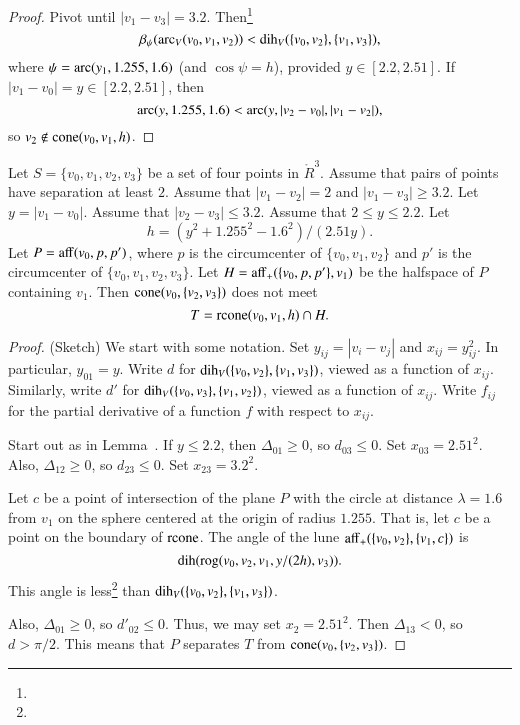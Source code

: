 \begin{proof}
Pivot until
$|v_1-v_3|=3.2$. Then\footnote{} %
    $$\beta_\psi(\operatorname{arc}_V(v_0,v_1,v_2))< \operatorname{dih}_V(\{v_0,v_2\},\{v_1,v_3\}),$$
where $\psi=\operatorname{arc}(y_1,1.255,1.6)$ (and $\cos\psi=h$),
provided $y\in[2.2,2.51]$. If
$|v_1-v_0|=y\in[2.2,2.51]$, then
    $$\operatorname{arc}(y,1.255,1.6)<\operatorname{arc}(y,|v_2-v_0|,|v_1-v_2|),$$
so $v_2\not\in{\operatorname{cone}}(v_0,v_1,h)$.
\end{proof}


\newpage

\begin{lemma} 
Let $S=\{v_0,v_1,v_2,v_3\}$ be a set of four points in $\ring{R}^3$.
Assume that pairs of points have separation at least $2$.
Assume that
$|v_1-v_2|=2$ and $|v_1-v_3|\ge3.2$.
Let $y = |v_1-v_0|$.
Assume that $|v_2-v_3|\le 3.2$.
Assume that $2\le y\le 2.2$.
Let 
$$
  h=(y^2+1.255^2-1.6^2)/(2.51 y).
$$
Let $P={\operatorname{aff}}(v_0,p,p')$, where $p$ is the circumcenter
of $\{v_0,v_1,v_2\}$ and $p'$ is the circumcenter of $\{v_0,v_1,v_2,v_3\}$.  
Let $H = {\operatorname{aff}}_+(\{v_0,p,p'\},v_1)$ 
be the halfspace of $P$ containing
$v_1$. 
Then ${\operatorname{cone}}(v_0,\{v_2,v_3\})$ does not meet
$$
  T={\operatorname{rcone}}(v_0,v_1,h) \cap H.
$$
\end{lemma}

\begin{proof} (Sketch)  We start with some notation.
Set $y_{ij}=|v_i-v_j|$ and $x_{ij} =y_{ij}^2$.  In particular, $y_{01}=y$.
Write $d$ for $\operatorname{dih}_V(\{v_0,v_2\},\{v_1,v_3\})$, viewed as a function
of $x_{ij}$.
Similarly, write $d'$ for $\operatorname{dih}_V(\{v_0,v_3\},\{v_1,v_2\})$, 
viewed as a function
of $x_{ij}$.
Write $f_{ij}$ for the
partial derivative of a function $f$ with respect to $x_{ij}$. 

Start out as in Lemma~.
If $y\le 2.2$, then $\Delta_{01}\ge0$, so
    $d_{03}\le 0$.
Set $x_{03}=2.51^2$. Also, $\Delta_{12}\ge0$, so
    $d_{23}\le0$.
Set $x_{23}=3.2^2$.

Let $c$ be a point of intersection of the plane $P$ with
the circle at distance $\lambda=1.6$ from $v_1$ on the sphere centered
at the origin of radius $1.255$.  That is, let $c$ be a point on the boundary
of ${\operatorname{rcone}}$.  The angle of the lune ${\operatorname{aff}}_+(\{v_0,v_2\},\{v_1,c\})$
is 
    $$\operatorname{dih}({\operatorname{rog}}(v_0,v_2,v_1,y/(2 h),v_3)).$$
This angle is less\footnote{} %
than $\operatorname{dih}_V(\{v_0,v_2\},\{v_1,v_3\})$. 

Also, $\Delta_{01}\ge0$, so $d'_{02}\le 0$.  Thus, we may
set $x_2=2.51^2$. Then
$\Delta_{13}<0$, so $d >\pi/2$.  This means that $P$
separates $T$ from ${\operatorname{cone}}(v_0,\{v_2,v_3\})$. 
\end{proof}
\newpage

